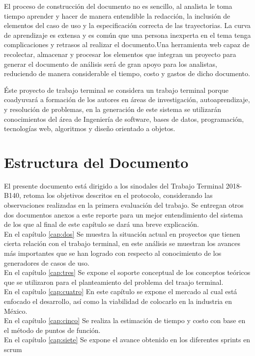 El proceso de construcción del documento no es sencillo, al analista le toma tiempo aprender y hacer de manera entendible la redacción, la inclusión de elementos del caso de uso y la especificación correcta de las trayectorias. La curva de aprendizaje es extensa y es común que una persona inexperta en el tema tenga complicaciones y retrasos al realizar el documento.Una herramienta web capaz de recolectar, almacenar y procesar los elementos que integran un proyecto para generar el documento de análisis será de gran apoyo para los analistas, reduciendo de manera considerable el tiempo, costo y gastos de dicho documento. 

Éste proyecto de trabajo terminal se considera un trabajo terminal porque coadyuvará a formación de los autores en áreas de investigación, autoaprendizaje, y resolución de problemas,  en la generación de este sistema se utilizarán conocimientos del área de Ingeniería de software, bases de datos, programación, tecnologías web, algoritmos y diseño orientado a objetos.

\section{Estructura del Documento}

El presente documento está dirigido a los sinodales del Trabajo Terminal 2018-B140, retoma los objetivos descritos en el protocolo, considerando las observaciones realizadas en la primera evaluación del trabajo. Se entregan otros dos documentos anexos a este reporte para un mejor entendimiento del sistema de los que al final de este capítulo se dará una breve explicación.\\

En el capítulo  \ref{cap:dos} Se muestra la situación actual en proyectos que tienen cierta relación con el trabajo terminal, en este análisis se muestran los avances más importantes que se han logrado con respecto al conocimiento de los generadores de casos de uso.\\

En el capítulo  \ref{cap:tres} Se expone el soporte conceptual de los conceptos teóricos que se utilizaron para el planteamiento del problema del traajo terminal.\\

En el capítulo  \ref{cap:cuatro} En este capítulo se expone el mercado al cual está enfocado
el desarrollo, así como la viabilidad de colocarlo en la industria en México.\\

En el capítulo  \ref{cap:cinco} Se realiza la estimación de tiempo y costo con base en el método de puntos de función.\\

En el capítulo  \ref{cap:siete} Se expone el avance obtenido en los diferentes sprints en scrum \\